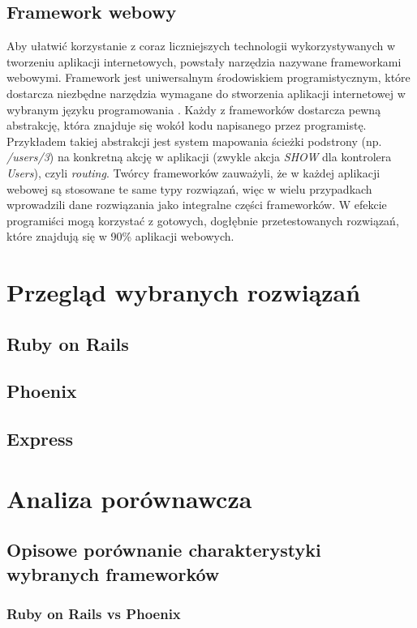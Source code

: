 \documentclass[mgr,oneside]{mgr}
\begin{document}
\section{Framework webowy} %
Aby ułatwić korzystanie z coraz liczniejszych technologii wykorzystywanych w tworzeniu aplikacji internetowych, powstały narzędzia nazywane frameworkami webowymi. Framework jest uniwersalnym środowiskiem programistycznym, które dostarcza niezbędne narzędzia wymagane do stworzenia aplikacji internetowej w wybranym języku programowania \cite{framework}. Każdy z frameworków dostarcza pewną abstrakcję, która znajduje się wokół kodu napisanego przez programistę. Przykładem takiej abstrakcji jest system mapowania ścieżki podstrony (np. \textit{/users/3}) na konkretną akcję w aplikacji (zwykle akcja \emph{SHOW} dla kontrolera \emph{Users}), czyli \emph{routing}. Twórcy frameworków zauważyli, że w każdej aplikacji webowej są stosowane te same typy rozwiązań, więc w wielu przypadkach wprowadzili dane rozwiązania jako integralne części frameworków. W efekcie programiści mogą korzystać z gotowych, dogłębnie przetestowanych rozwiązań, które znajdują się w 90\% aplikacji webowych.

\chapter{Przegląd wybranych rozwiązań}
\section{Ruby on Rails}
\section{Phoenix}
\section{Express}

\chapter{Analiza porównawcza}
\section{Opisowe porównanie charakterystyki wybranych frameworków}
\subsection{Ruby on Rails vs Phoenix}
\end{document}
